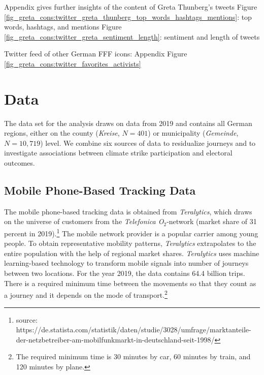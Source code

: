 \restoregeometry








Appendix gives further insights of the content of Greta Thunberg's tweets
Figure \ref{fig_greta_cons:twitter_greta_thunberg_top_words_hashtags_mentions}: top words, hashtags, and mentions
Figure \ref{fig_greta_cons:twitter_greta_sentiment_length}: sentiment and length of tweets


Twitter feed of other German FFF icons: Appendix Figure \ref{fig_greta_cons:twitter_favorites_activists}
















\newpage
\section{Data}\label{sec_greta_cons:data} 
The data set for the analysis draws on data from 2019 and contains all German regions, either on the county (\textit{Kreise}, $N=401$) or municipality (\textit{Gemeinde}, $N=10,719$) level. We combine six sources of data to residualize journeys and to investigate associations between climate strike participation and electoral outcomes.




\subsection{Mobile Phone-Based Tracking Data}
The mobile phone-based tracking data is obtained from \textit{Teralytics}, which draws on the universe of customers from the \textit{Telefonica O$_2$}-network (market share of 31 percent in 2019).\footnote{source: https://de.statista.com/statistik/daten/studie/3028/umfrage/marktanteile-der-netzbetreiber-am-mobilfunkmarkt-in-deutschland-seit-1998/} The mobile network provider is a popular carrier among young people. To obtain representative mobility patterns, \textit{Teralytics} extrapolates to the entire population with the help of regional market shares. \textit{Teralytics} uses machine learning-based technology to transform mobile signals into number of journeys between two locations. For the year 2019, the data contains 64.4 billion trips. There is a required minimum time between the movements so that they count as a journey and it depends on the mode of transport.\footnote{The required minimum time is 30 minutes by car, 60 minutes by train, and 120 minutes by plane.} 

